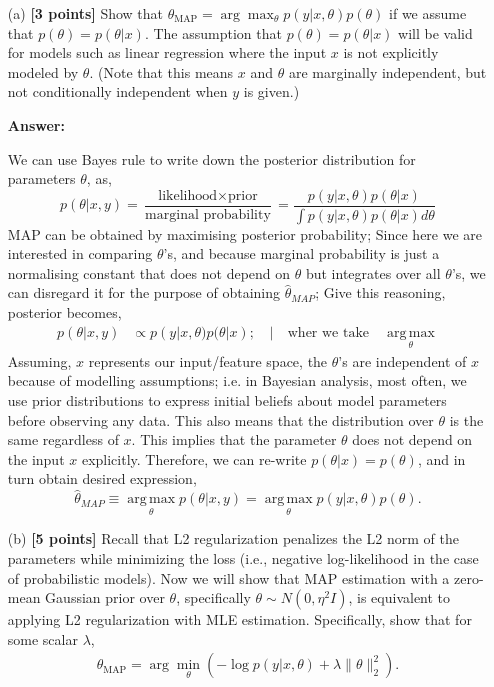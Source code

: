 \documentclass{article}
\DeclareMathOperator*{\argmax}{arg\,max}
\begin{document}
\begin{enumerate}
  \item[(a)] \textbf{[3 points]} Show that $\theta_{\text{MAP}} = \arg\max_{\theta} p(y|x, \theta)p(\theta)$ if we assume that $p(\theta) = p(\theta|x)$. The assumption that $p(\theta) = p(\theta|x)$ will be valid for models such as linear regression where the input $x$ is not explicitly modeled by $\theta$. (Note that this means $x$ and $\theta$ are marginally independent, but not conditionally independent when $y$ is given.)

\textbf{Answer:}

We can use Bayes rule to write down the posterior distribution for parameters $\theta$, as,
\[
p(\theta|x,y) = \frac{\mbox{likelihood}\times \mbox{prior}}{\mbox{marginal probability}} =\frac{p(y|x,\theta)p(\theta|x)}{\int p(y|x,\theta)p(\theta|x) d\theta}
\]
MAP can be obtained by maximising posterior probability; Since here we are interested in comparing $\theta$'s, and because marginal probability is just a normalising constant that does not depend on $\theta$ but integrates over all $\theta$'s, we can disregard it for the purpose of obtaining $\hat{\theta}_{MAP}$; Give this reasoning, posterior becomes,
\begin{align*}
    p(\theta|x,y) & \propto p(y|x,\theta)p(\theta|x); \quad |\quad \mbox{wher we take}\quad \argmax\limits_{\theta}
\end{align*}
Assuming, $x$ represents our input/feature space, the $\theta$'s are independent of $x$ because of modelling assumptions;
i.e. in Bayesian analysis, most often, we use  prior distributions to express initial beliefs about model parameters before observing any data. This also means that the distribution over $\theta$ is the same regardless of $x$. This implies that the parameter $\theta$ does not depend on the input $x$ explicitly. Therefore, we can re-write $p(\theta|x) = p(\theta)$, and in turn obtain desired expression,
\[
\hat{\theta}_{MAP}\equiv \argmax\limits_{\theta} p(\theta|x,y) = \argmax\limits_{\theta} p(y|x,\theta)p(\theta).
\]





  \item[(b)] \textbf{[5 points]} Recall that L2 regularization penalizes the L2 norm of the parameters while minimizing the loss (i.e., negative log-likelihood in the case of probabilistic models). Now we will show that MAP estimation with a zero-mean Gaussian prior over $\theta$, specifically $\theta \sim N(0,\eta^2I)$, is equivalent to applying L2 regularization with MLE estimation. Specifically, show that for some scalar $\lambda$,
  \begin{align*}
  \theta_{\text{MAP}} = \arg\min_{\theta} (-\log p(y|x,\theta) + \lambda\|\theta\|_2^2).
  \end{align*}
  

\end{enumerate}
\end{document}
